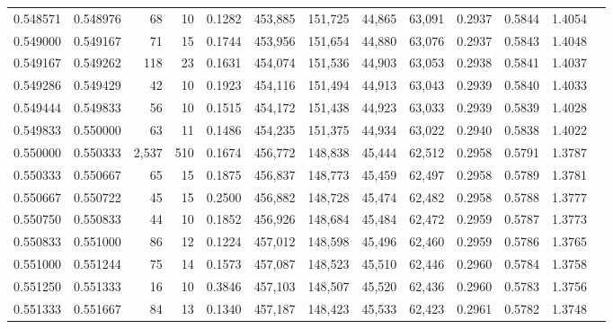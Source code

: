 \begin{tabular}{rrrrrrrrrrrrr}
0.548571 & 0.548976 &    68 &  10 &                                     0.1282 & 453,885 & 151,725 &  44,865 &  63,091 & 0.2937 & 0.5844 & 1.4054 \\
0.549000 & 0.549167 &    71 &  15 &                                     0.1744 & 453,956 & 151,654 &  44,880 &  63,076 & 0.2937 & 0.5843 & 1.4048 \\
0.549167 & 0.549262 &   118 &  23 &                                     0.1631 & 454,074 & 151,536 &  44,903 &  63,053 & 0.2938 & 0.5841 & 1.4037 \\
0.549286 & 0.549429 &    42 &  10 &                                     0.1923 & 454,116 & 151,494 &  44,913 &  63,043 & 0.2939 & 0.5840 & 1.4033 \\
0.549444 & 0.549833 &    56 &  10 &                                     0.1515 & 454,172 & 151,438 &  44,923 &  63,033 & 0.2939 & 0.5839 & 1.4028 \\
0.549833 & 0.550000 &    63 &  11 &                                     0.1486 & 454,235 & 151,375 &  44,934 &  63,022 & 0.2940 & 0.5838 & 1.4022 \\
0.550000 & 0.550333 & 2,537 & 510 &                                     0.1674 & 456,772 & 148,838 &  45,444 &  62,512 & 0.2958 & 0.5791 & 1.3787 \\
0.550333 & 0.550667 &    65 &  15 &                                     0.1875 & 456,837 & 148,773 &  45,459 &  62,497 & 0.2958 & 0.5789 & 1.3781 \\
0.550667 & 0.550722 &    45 &  15 &                                     0.2500 & 456,882 & 148,728 &  45,474 &  62,482 & 0.2958 & 0.5788 & 1.3777 \\
0.550750 & 0.550833 &    44 &  10 &                                     0.1852 & 456,926 & 148,684 &  45,484 &  62,472 & 0.2959 & 0.5787 & 1.3773 \\
0.550833 & 0.551000 &    86 &  12 &                                     0.1224 & 457,012 & 148,598 &  45,496 &  62,460 & 0.2959 & 0.5786 & 1.3765 \\
0.551000 & 0.551244 &    75 &  14 &                                     0.1573 & 457,087 & 148,523 &  45,510 &  62,446 & 0.2960 & 0.5784 & 1.3758 \\
0.551250 & 0.551333 &    16 &  10 &                                     0.3846 & 457,103 & 148,507 &  45,520 &  62,436 & 0.2960 & 0.5783 & 1.3756 \\
0.551333 & 0.551667 &    84 &  13 &                                     0.1340 & 457,187 & 148,423 &  45,533 &  62,423 & 0.2961 & 0.5782 & 1.3748 \\

\end{tabular}
